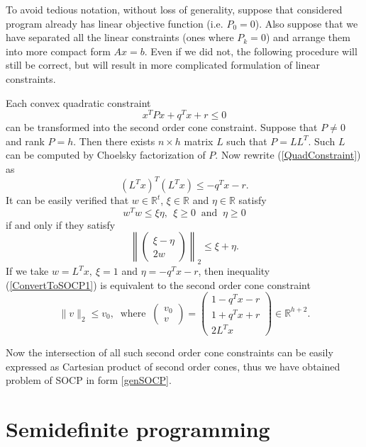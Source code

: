 \documentclass[12pt]{book}
\theoremstyle{definition}
\begin{document}
To avoid tedious notation, without loss of generality, suppose that considered program already has linear objective function (i.e. $P_0 = 0$).  Also suppose that we have separated all the linear constraints (ones where $P_k = 0$) and arrange them into more compact form $Ax=b$. Even if we did not, the following procedure will still be correct, but will result in more complicated formulation of linear constraints.

Each convex quadratic constraint 
\begin{equation}
\label{QuadConstraint}
x^TPx + q^Tx + r \leq 0
\end{equation} 
can be transformed into the second order cone constraint.  Suppose that $P\neq 0$ and rank $P = h.$ Then there exists $n\times h$ matrix $L$ such that $P=LL^T$. Such $L$ can be computed by Choelsky factorization of $P$. Now rewrite (\ref{QuadConstraint}) as 
\begin{equation}
\label{ConvertToSOCP1}
(L^Tx)^T(L^Tx)\leq -q^Tx - r.
\end{equation}
It can be easily verified that $w\in \mathbb{R}^t$, $\xi \in \mathbb{R}$ and $\eta \in \mathbb{R}$ satisfy
$$w^Tw\leq \xi\eta, \ \ \xi\geq 0\ \mbox{ and } \ \eta\geq 0$$
if and only if they satisfy
$$\left\|\left( \begin{array}{c}
\xi-\eta\\
2w
\end{array}\right)\right\|_2
\leq \xi+\eta . $$
If we take $w=L^Tx, \ \xi = 1$ and $\eta = -q^Tx - r$, then inequality (\ref{ConvertToSOCP1}) is equivalent to the second order cone constraint
\begin{equation}
\label{ConvertedQCintoSOCC}
 \|v\|_2\leq v_0, \ \mbox{  where  } \ \left(\begin{array}{c}
v_0\\
v
\end{array}\right) = 
\left(\begin{array}{c}
1- q^Tx - r\\
1 + q^Tx + r\\
2L^Tx
\end{array}\right)\in \mathbb{R}^{h+2}.
\end{equation}

Now the intersection of all such second order cone constraints can be easily expressed as Cartesian product of second order cones, thus we have obtained problem of SOCP in form \ref{genSOCP}. 


\section{Semidefinite programming}
\end{document}
